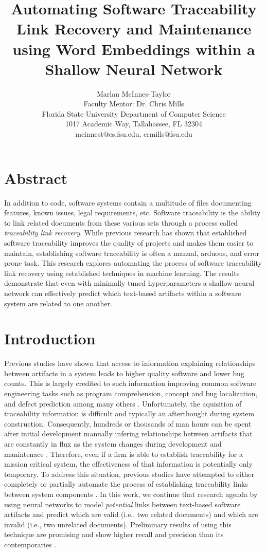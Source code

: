 \documentclass{article}
\title{Automating Software Traceability Link Recovery and Maintenance using Word Embeddings within a Shallow Neural Network}
\author{Marlan McInnes-Taylor\\Faculty Mentor: Dr. Chris Mills\\Florida State University Department of Computer Science\\1017 Academic Way, Tallahassee, FL 32304\\mcinnest@cs.fsu.edu, crmills@fsu.edu}
\date{}
\begin{document}
\maketitle

\section{Abstract}
In addition to code, software systems contain a multitude of files documenting features, known issues, legal requirements, etc. Software traceability is the ability to link related documents from these various sets through a process called \textit{traceability link recovery}. While previous research has shown that established software traceability improves the quality of projects and makes them easier to maintain, establishing software traceability is often a manual, arduous, and error prone task. This research explores automating the process of software traceability link recovery using established techniques in machine learning. The results demonstrate that even with minimally tuned hyperparameters a shallow neural network can effectively predict which text-based artifacts within a software system are related to one another.

\section{Introduction}
    Previous studies have shown that access to information explaining relationships between artifacts in a system leads to higher quality software and lower bug counts. This is largely credited to such information improving common software engineering tasks such as program comprehension, concept and bug localization, and defect prediction among many others \cite{bouillon2013survey, mader2015developers, mader2016preventing}. Unfortunately, the aquisition of traceability information is difficult and typically an afterthought during system construction. Consequently, hundreds or thousands of man hours can be spent after initial development manually infering relationships between artifacts that are constantly in flux as the system changes during development and manintenace \cite{james1997automatic, weidenhaupt1998scenarios, antoniol2000traceability}. Therefore, even if a firm is able to establish traceability for a mission critical system, the effectiveness of that information is potentially only temporary. To address this situation, previous studies have attempted to either completely or partially automate the process of establishing traceability links between system components \cite{borg2014recovering}. In this work, we continue that research agenda by using neural networks to model \textit{potential} links between text-based software artifacts and predict which are valid (i.e., two related documents) and which are invalid (i.e., two unrelated documents). Preliminary results of using this technique are promising and show higher recall and precision than its contemporaries \cite{mills2018automatic, mills2019tracing}.
\end{document}
